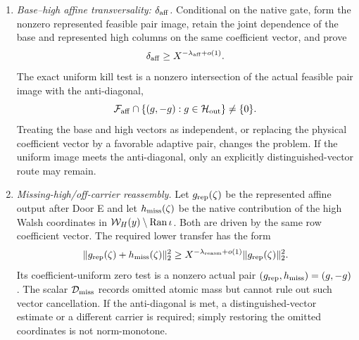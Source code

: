\begin{enumerate}[label=\textbf{Door \Alph*.},leftmargin=3.8em]
 \item \emph{Base--high affine transversality:
       \(\delta_{\rm aff}\).}
       Conditional on the native gate, form the nonzero represented feasible
       pair image, retain the joint dependence of the base and represented
       high columns on the same coefficient vector, and prove
       \begin{equation}
        \delta_{\rm aff}
        \ge X^{-\lambda_{\rm aff}+o(1)}.
        \label{eq:tpc59-next-affine-angle}
       \end{equation}
       The exact uniform kill test is a nonzero intersection of the actual
       feasible pair image with the anti-diagonal,
       \begin{equation}
        \mathcal F_{\rm aff}\cap\{(g,-g):g\in\mathcal H_{\rm out}\}
        \ne\{0\}.
        \label{eq:tpc59-next-affine-kernel-kill}
       \end{equation}
       Treating the base and high vectors as independent, or replacing the
       physical coefficient vector by a favorable adaptive pair, changes
       the problem.  If the uniform image meets the anti-diagonal, only an
       explicitly distinguished-vector route may remain.

 \item \emph{Missing-high/off-carrier reassembly.}
       Let \(g_{\rm rep}(\zeta)\) be the represented affine output after
       Door E and let \(h_{\rm miss}(\zeta)\) be the native contribution of
       the high Walsh coordinates in
       \(\mathcal W_H(y)\setminus\operatorname{Ran}\iota\).  Both are driven by the same row
       coefficient vector.  The required lower transfer has the form
       \begin{equation}
        \|g_{\rm rep}(\zeta)+h_{\rm miss}(\zeta)\|_2^2
        \ge
        X^{-\lambda_{\rm reasm}+o(1)}
        \|g_{\rm rep}(\zeta)\|_2^2.
        \label{eq:tpc59-next-missing-high-reassembly}
       \end{equation}
       Its coefficient-uniform zero test is a nonzero actual pair
       \((g_{\rm rep},h_{\rm miss})=(g,-g)\).  The scalar
       \(\mathcal D_{\rm miss}\) records omitted atomic mass but cannot rule out
       such vector cancellation.  If the anti-diagonal is met, a
       distinguished-vector estimate or a different carrier is required;
       simply restoring the omitted coordinates is not norm-monotone.


\end{enumerate}
